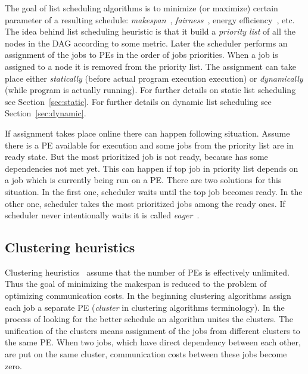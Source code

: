 The goal of list scheduling algorithms is to minimize (or maximize)
certain parameter of a resulting schedule:
\emph{makespan}~\cite{arabnejad2014list},
\emph{fairness}~\cite{zaharia2010delay}, energy
efficiency~\cite{zong2013green}, etc. The idea behind list scheduling
heuristic is that it build a \emph{priority list} of all the nodes in
the DAG according to some metric. Later the scheduler performs an
assignment of the jobs to PEs in the order of jobs priorities. When a
job is assigned to a node it is removed from the priority list. The
assignment can take place either \emph{statically} (before actual
program execution execution) or \emph{dynamically} (while program is
actually running). For further details on static list scheduling see
Section~\ref{sec:static}. For further details on dynamic list
scheduling see Section~\ref{sec:dynamic}.

If assignment takes place online there can happen following
situation. Assume there is a PE available for execution and some jobs
from the priority list are in ready state. But the most prioritized
job is not ready, because has some dependencies not met yet. This can
happen if top job in priority list depends on a job which is currently
being run on a PE. There are two solutions for this situation. In the
first one, scheduler waits until the top job becomes ready. In the
other one, scheduler takes the most prioritized jobs among the ready
ones. If scheduler never intentionally waits it is called
\emph{eager}~\cite{canon2007comparison}.

\subsection{Clustering heuristics}
\label{sec:clustering}


Clustering heuristics~\cite{singh2008workflow, liou1996efficient,
  kwok1999static, gerasoulis1992comparison%
} assume that the number of PEs is effectively unlimited. Thus the
goal of minimizing the makespan is reduced to the problem of
optimizing communication costs. In the beginning clustering algorithms
assign each job a separate PE (\emph{cluster} in clustering algorithms
terminology). In the process of looking for the better schedule an
algorithm unites the clusters. The unification of the clusters means
assignment of the jobs from different clusters to the same PE. When
two jobs, which have direct dependency between each other, are put on
the same cluster, communication costs between these jobs become zero.

